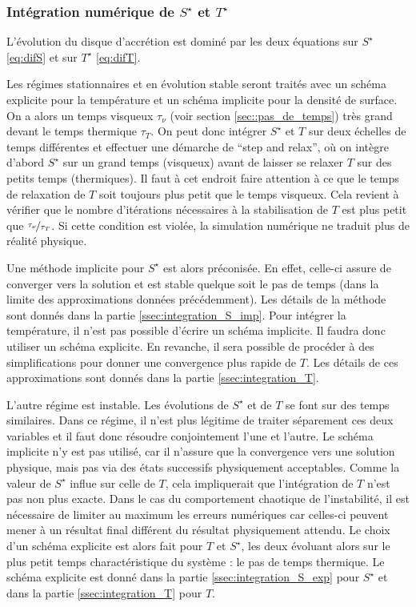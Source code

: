 \subsubsection{Intégration numérique de $S^\star$ et $T^\star$}

L'évolution du disque d'accrétion est dominé par les deux équations sur
$S^\star$ \eqref{eq:difS} et sur $T^\star$ \eqref{eq:difT}.

Les régimes stationnaires et en évolution stable seront traités avec un schéma
explicite pour la température et un schéma implicite pour la densité de
surface. On a alors un temps visqueux $\tau_\nu$  (voir section \ref{sec::pas_de_temps}) très grand devant le temps
thermique $\tau_T$. On peut donc intégrer $S^\star$ et $T$ sur deux échelles de
temps différentes et effectuer une démarche de ``step and relax'', où on
intègre d'abord $S^\star$ sur un grand temps (visqueux) avant de laisser se
relaxer $T$ sur des petits temps (thermiques). Il faut à cet endroit faire
attention à ce que le temps de relaxation de $T$ soit toujours plus petit que
le temps visqueux. Cela revient à vérifier que le nombre d'itérations
nécessaires à la stabilisation de $T$ est plus petit que
$\nicefrac{\tau_\nu}{\tau_T}$. Si cette condition est violée, la simulation
numérique ne traduit plus de réalité physique. 

Une méthode implicite pour $S^\star$ est alors préconisée. En effet, celle-ci
assure de converger vers la solution et est stable quelque soit le pas de temps
(dans la limite des approximations données précédemment). Les détails de la
méthode sont donnés dans la partie \ref{ssec:integration_S_imp}. Pour intégrer
la température, il n'est pas possible d'écrire un schéma implicite. Il faudra
donc utiliser un schéma explicite. En revanche, il sera possible de procéder à
des simplifications pour donner une convergence plus rapide de $T$. Les détails
de ces approximations sont donnés dans la partie \ref{ssec:integration_T}.

L'autre régime est instable. Les évolutions de $S^\star$ et de $T$ se font sur
des temps similaires. Dans ce régime, il n'est plus légitime de traiter
séparement ces deux variables et il faut donc résoudre conjointement l'une et
l'autre. Le schéma implicite n'y est pas utilisé, car il n'assure que la
convergence vers une solution physique, mais pas via des états successifs
physiquement acceptables. Comme la valeur de $S^\star$ influe sur celle de $T$,
cela impliquerait que l'intégration de $T$ n'est pas non plus exacte. Dans le
cas du comportement chaotique de l'instabilité, il est nécessaire de limiter au
maximum les erreurs numériques car celles-ci peuvent mener à un résultat final
différent du résultat physiquement attendu. Le choix d'un schéma explicite est
alors fait pour $T$ et $S^\star$, les deux évoluant alors sur le plus petit
temps charactéristique du système : le pas de temps thermique. Le schéma
explicite est donné dans la partie \ref{ssec:integration_S_exp} pour $S^\star$
et dans la partie \ref{ssec:integration_T} pour $T$.

